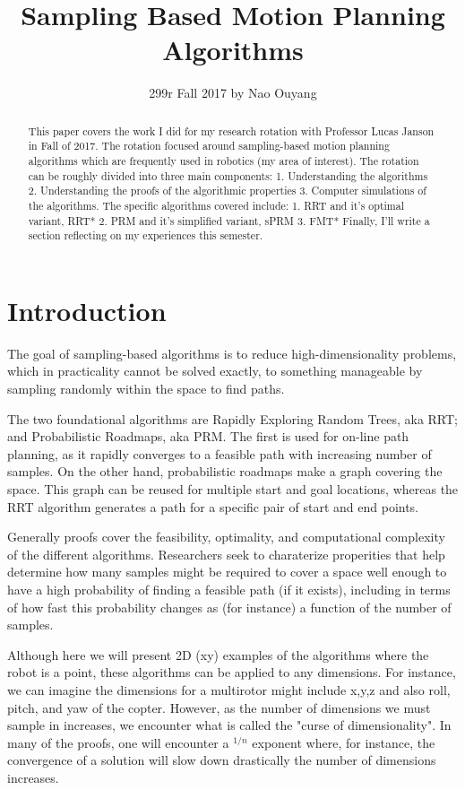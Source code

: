 \documentclass[a4paper]{article}
\title{Sampling Based Motion Planning Algorithms}
\author{299r Fall 2017 by Nao Ouyang}
\begin{document}
\maketitle

\begin{abstract} 
This paper covers the work I did for my research rotation with Professor Lucas
Janson in Fall of 2017. The rotation focused around sampling-based motion
planning algorithms which are frequently used in robotics (my area of
interest).  The rotation can be roughly divided into three main components: 1.
Understanding the algorithms 2. Understanding the proofs of the algorithmic
properties 3. Computer simulations of the algorithms. The specific algorithms
covered include: 1. RRT and it's optimal variant, RRT* 2. PRM and it's
simplified variant, sPRM 3. FMT* Finally, I'll write a section reflecting on my
experiences this semester.

\end{abstract}

\section{Introduction}

The goal of sampling-based algorithms is to reduce high-dimensionality
problems, which in practicality cannot be solved exactly, to something
manageable by sampling randomly within the space to find paths.

The two foundational algorithms are Rapidly Exploring Random Trees, aka RRT;
and Probabilistic Roadmaps, aka PRM. The first is used for on-line path
planning, as it rapidly converges to a feasible path with increasing number of
samples. On the other hand, probabilistic roadmaps make a graph covering the
space. This graph can be reused for multiple start and goal locations, whereas
the RRT algorithm generates a path for a specific pair of start and end points.

Generally proofs cover the feasibility, optimality, and computational complexity
of the different algorithms. Researchers seek to charaterize properities that
help determine how many samples might be required to cover a space well enough
to have a high probability of finding a feasible path (if it exists), including
in terms of how fast this probability changes as (for instance) a function of
the number of samples.

Although here we will present 2D (xy) examples of the algorithms where the robot
is a point, these algorithms can be applied to any dimensions. For instance, we
can imagine the dimensions for a multirotor might include x,y,z and also roll,
pitch, and yaw of the copter. However, as the number of dimensions we must sample in
increases, we encounter what is called the "curse of dimensionality". In many of
the proofs, one will encounter a $^{1/n}$ exponent where, for instance, the
convergence of a solution will slow down drastically the number of dimensions
increases.
\end{document}
